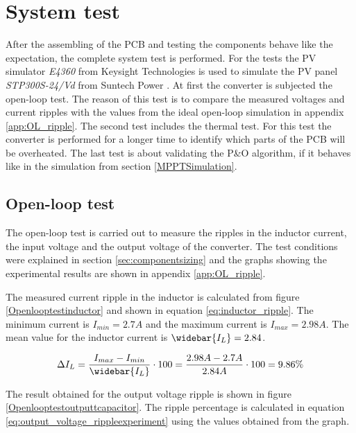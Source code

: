 \section{System test}
After the assembling of the PCB and testing the components behave like the expectation, the complete system test is performed. For the tests the PV simulator \textit{E4360} from Keysight Technologies \cite{PV_simulator} is used to simulate the PV panel \textit{STP300S-24/Vd} from Suntech Power \cite{PV_panel}. At first the converter is subjected the open-loop test. The reason of this test is to compare the measured voltages and current ripples with the values from the ideal open-loop simulation in appendix \ref{app:OL_ripple}. The second test includes the thermal test. For this test the converter is performed for a longer time to identify which parts of the PCB will be overheated. The last test is about validating the P\&O algorithm, if it behaves like in the simulation from section \ref{MPPTSimulation}.

\subsection{Open-loop test}

The open-loop test is carried out to measure the ripples in the inductor current, the input voltage and the output voltage of the converter. The test conditions were explained in section \ref{sec:componentsizing} and the graphs showing the experimental results are shown in appendix \ref{app:OL_ripple}.

The measured current ripple in the inductor is calculated from figure \ref{Openlooptestinductor} and shown in equation \ref{eq:inductor_ripple}. The minimum current is $I_{min} = 2.7A$ and the maximum current is $I_{max} = 2.98A$. The mean value for the inductor current is $\widebar{I_L}= 2.84$. 

\begin{equation} \label{eq:inductor_rippleexpirment}
\Delta I_L = \frac{I_{max}-I_{min}}{\widebar{I_L}} \cdot 100 = \frac{2.98A-2.7A}{2.84A} \cdot 100 = 9.86\%
\end{equation}

The result obtained for the output voltage ripple is shown in figure \ref{Openlooptestoutputtcapacitor}. The ripple percentage is calculated in equation \ref{eq:output_voltage_rippleexperiment} using the values obtained from the graph. 

